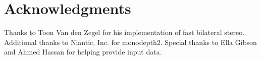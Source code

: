 \documentclass[10pt,twocolumn,letterpaper]{article}
\begin{document}
\section*{Acknowledgments}

Thanks to Toon Van den Zegel for his implementation of fast bilateral stereo. Additional thanks to Niantic, Inc. for monodepth2. Special thanks to Ella Gibson and Ahmed Hassan for helping provide input data.

{\small

}
\end{document}

